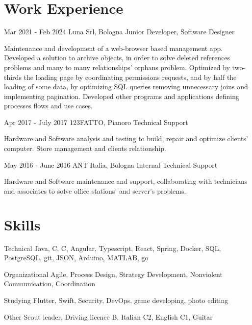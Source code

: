 \documentclass{tccv}
\begin{document}
\section{Work Experience}
\hfill
\begin{eventlist}

    \item{Mar 2021 - Feb 2024}
          {Luna Srl, Bologna}
          {Junior Developer, Software Designer}

    Maintenance and development of a web-browser based management app. Developed a solution to archive objects, in order to solve deleted references problems and many to many relationships' orphans problem.
    Optimized by two-thirds the loading page by coordinating permissions requests, and by half the loading of some data, by optimizing SQL queries removing unnecessary joins and implementing pagination.
    Developed other programs and applications defining processes flows and use cases.

    \item{Apr 2017 - July 2017}
          {123FATTO, Pianoro}
          {Technical Support}

    Hardware and Software analysis and testing to build, repair and optimize clients' computer. Store management and clients relationship.
    \item{May 2016 - June 2016}
          {ANT Italia, Bologna}
          {Internal Technical Support}

    Hardware and Software maintenance and support, collaborating with technicians and associates to solve office stations' and server's problems.
\end{eventlist}

\section{Skills}

\begin{factlist}
    \item{Technical}
          {Java, C, C, Angular, Typescript, React, Spring, Docker, SQL, PostgreSQL, git, JSON, Arduino, MATLAB, go}

    \item{Organizational}
          {Agile, Process Design, Strategy Development, Nonviolent Communication, Coordination}

    \item{Studying}
          {Flutter, Swift, Security, DevOps, game developing, photo editing}

    \item{Other}
          {Scout leader, Driving licence B, Italian C2, English C1, Guitar}
\end{factlist}
\end{document}
